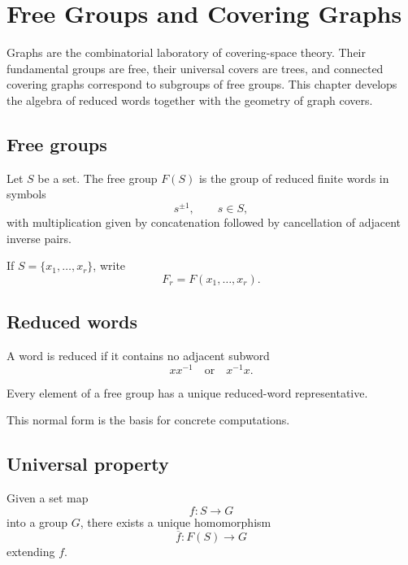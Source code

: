 ﻿\chapter{Free Groups and Covering Graphs}
\label{ch:viii14-free-groups-covering-graphs}

Graphs are the combinatorial laboratory of covering-space theory.  Their
fundamental groups are free, their universal covers are trees, and connected
covering graphs correspond to subgroups of free groups.  This chapter develops
the algebra of reduced words together with the geometry of graph covers.

\section{Free groups}

\begin{definition}
\label{def:viii14-free-group}
Let \(S\) be a set.  The free group \(F(S)\) is the group of reduced finite
words in symbols
\[
s^{\pm1},\qquad s\in S,
\]
with multiplication given by concatenation followed by cancellation of adjacent
inverse pairs.
\end{definition}

If \(S=\{x_1,\dots,x_r\}\), write
\[
F_r=F(x_1,\dots,x_r).
\]

\section{Reduced words}

A word is reduced if it contains no adjacent subword
\[
xx^{-1}
\quad\text{or}\quad
x^{-1}x.
\]

\begin{proposition}
\label{prop:viii14-reduced}
Every element of a free group has a unique reduced-word representative.
\end{proposition}

This normal form is the basis for concrete computations.

\section{Universal property}

\begin{theorem}
\label{thm:viii14-universal-free}
Given a set map
\[
f:S\to G
\]
into a group \(G\), there exists a unique homomorphism
\[
\overline f:F(S)\to G
\]
extending \(f\).
\end{theorem}

